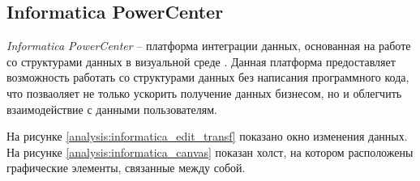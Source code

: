 \begin{figure}[ht!]
\end{figure}

\newpage

\subsection{Informatica PowerCenter}

\textit{Informatica PowerCenter} -- платформа интеграции данных, основанная на 
работе со структурами данных в визуальной среде \cite{bib3}.  
Данная платформа предоставляет возможность работать со структурами данных 
без написания программного кода, что позваоляет не только ускорить получение данных бизнесом,
но и облегчить взаимодействие с данными пользователям. 

На рисунке \ref{analysis:informatica_edit_transf} показано окно изменения данных. 
На рисунке \ref{analysis:informatica_canvas} показан холст, на котором расположены графические 
элементы, связанные между собой. 

\begin{figure}[ht!]
\end{figure}

